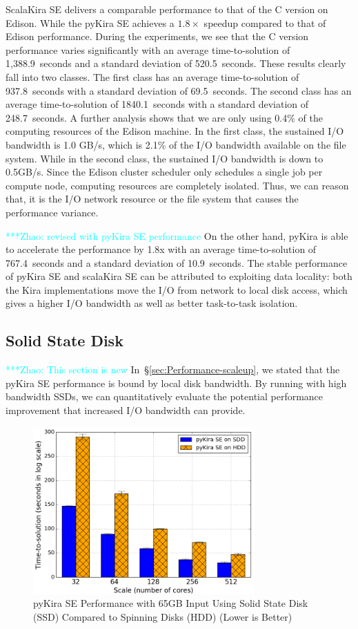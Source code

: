 \documentclass[10pt,journal,compsoc]{IEEEtran}
\newcommand{\zhaonote}[1]{{\textcolor{cyan}    { ***Zhao:      #1 }}}
\newcommand{\zhaonote}[1]{}
\begin{document}
ScalaKira SE delivers a comparable performance to that of the C version on Edison. 
While the pyKira SE achieves a $1.8\times$ speedup compared to that of Edison performance.
During the experiments, we see that the C version performance varies significantly with an 
average time-to-solution of 1,388.9~seconds and a standard deviation of 520.5~seconds. 
These results clearly fall into two classes. The first class has an average time-to-solution of 937.8~seconds
with a standard deviation of 69.5~seconds. The second class has an average time-to-solution 
of 1840.1~seconds with a standard deviation of 248.7~seconds. A further analysis shows that we are only 
using 0.4\% of the computing resources of the Edison machine. In the first class, the sustained
I/O bandwidth is 1.0 GB/s, which is 2.1\% of the I/O bandwidth available on the file system.
While in the second class, the sustained I/O bandwidth is down to 0.5GB/s.
Since the Edison cluster scheduler only schedules a single job per compute node, computing resources 
are completely isolated. Thus, we can reason that, it is the I/O network resource or the file system 
that causes the performance variance. 

\zhaonote{revised with pyKira SE performance}
On the other hand, pyKira is able to accelerate the performance by 1.8x with an average time-to-solution of
767.4~seconds and a standard deviation of 10.9~seconds. The stable performance of pyKira SE
and scalaKira SE can be attributed to exploiting data locality: both the Kira implementations move the I/O from network
to local disk access, which gives a higher I/O bandwidth as well as better task-to-task isolation.

\subsection{Solid State Disk}
\zhaonote{This section is new}
In~\S\ref{sec:Performance-scaleup}, we stated that the pyKira SE performance is bound by local disk bandwidth.
By running with high bandwidth SSDs, we can quantitatively evaluate the potential performance improvement that
increased I/O bandwidth can provide.

\begin{figure}[h]
	\begin{center}
		\includegraphics[width=85mm]{pictures/ssd-65GB}
		\caption{pyKira SE Performance with 65GB Input Using Solid State Disk (SSD) Compared to Spinning Disks (HDD)  (Lower is Better)
		\label{fig:ssd-65GB}}
  	\end{center}
\end{figure}
\end{document}
